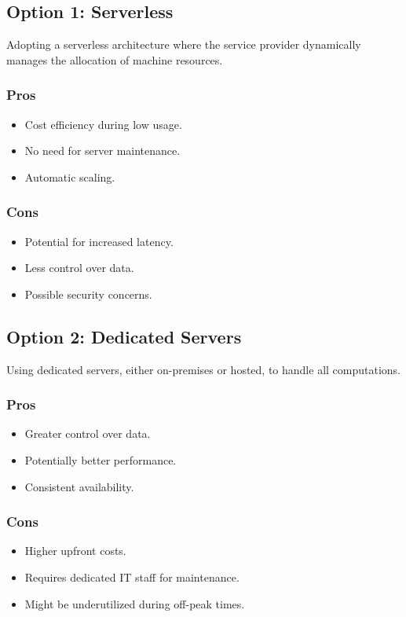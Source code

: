 \subsection*{Option 1: Serverless}
Adopting a serverless architecture where the service provider dynamically manages the allocation of machine resources.
\subsubsection*{Pros}
\begin{itemize}
    \item Cost efficiency during low usage.
    \item No need for server maintenance.
    \item Automatic scaling.
\end{itemize}
\subsubsection*{Cons}
\begin{itemize}
    \item Potential for increased latency.
    \item Less control over data.
    \item Possible security concerns.
\end{itemize}

\subsection*{Option 2: Dedicated Servers}
Using dedicated servers, either on-premises or hosted, to handle all computations.
\subsubsection*{Pros}
\begin{itemize}
    \item Greater control over data.
    \item Potentially better performance.
    \item Consistent availability.
\end{itemize}
\subsubsection*{Cons}
\begin{itemize}
    \item Higher upfront costs.
    \item Requires dedicated IT staff for maintenance.
    \item Might be underutilized during off-peak times.
\end{itemize}

